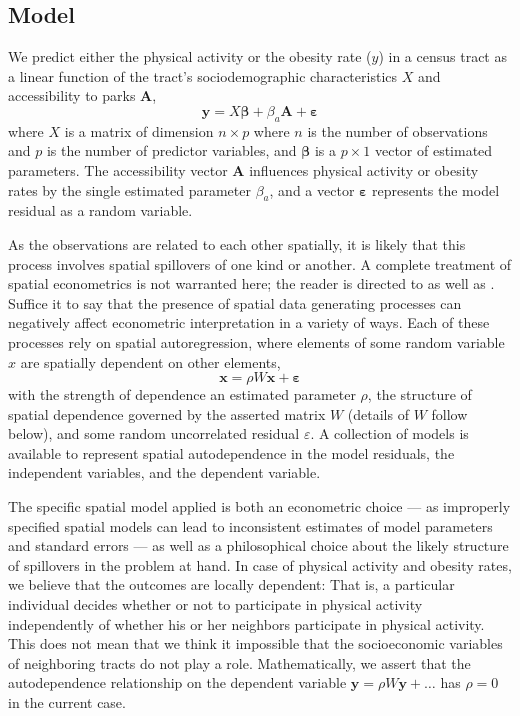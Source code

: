 \documentclass[shortAfour,sageh.bst]{sagej}
\begin{document}
\hypertarget{model}{%
\subsection{Model}\label{model}}

\label{subsec:model}

We predict either the physical activity or the obesity rate (\(y\)) in a
census tract as a linear function of the tract's sociodemographic
characteristics \(X\) and accessibility to parks \(\boldsymbol{A}\),
\begin{equation}\label{eq:themodel}
 \boldsymbol{y} = X\boldsymbol{\beta} + \beta_{a}\boldsymbol{A} + \boldsymbol{\varepsilon}
\end{equation}
where \(X\) is a matrix of dimension \(n\times p\) where
\(n\) is the number of observations and \(p\) is the number of predictor
variables, and \(\boldsymbol{\beta}\) is a \(p\times 1\) vector of
estimated parameters. The accessibility vector \(\boldsymbol{A}\)
influences physical activity or obesity rates by the single estimated
parameter \(\beta_a\), and a vector \(\boldsymbol{\varepsilon}\)
represents the model residual as a random variable.

As the observations are related to each other spatially, it is likely
that this process involves spatial spillovers of one kind or another. A
complete treatment of spatial econometrics is not warranted here; the
reader is directed to \citet{LeSage2009} as well as \citet{LeSage2014}.
Suffice it to say that the presence of spatial data generating processes
can negatively affect econometric interpretation in a variety of ways.
Each of these processes rely on spatial autoregression, where elements
of some random variable \(x\) are spatially dependent on other elements,
\begin{equation}\label{eq:autoregression}
 \boldsymbol{x} = \rho W \boldsymbol{x} + \boldsymbol{\varepsilon}
\end{equation} with the strength of dependence an estimated parameter
\(\rho\), the structure of spatial dependence governed by the asserted
matrix \(W\) (details of \(W\) follow below), and some random
uncorrelated residual \(\varepsilon\). A collection of models is
available to represent spatial autodependence in the model residuals,
the independent variables, and the dependent variable.

The specific spatial model applied is both an econometric choice --- as
improperly specified spatial models can lead to inconsistent estimates
of model parameters and standard errors --- as well as a philosophical
choice about the likely structure of spillovers in the problem at hand.
In case of physical activity and obesity rates, we believe that the
outcomes are locally dependent: That is, a particular individual decides
whether or not to participate in physical activity independently of
whether his or her neighbors participate in physical activity. This does
not mean that we think it impossible that the socioeconomic variables of
neighboring tracts do not play a role. Mathematically, we assert that
the autodependence relationship on the dependent variable
\(\boldsymbol{y} = \rho W \boldsymbol{y} + \ldots\) has \(\rho = 0\) in
the current case.
\end{document}
